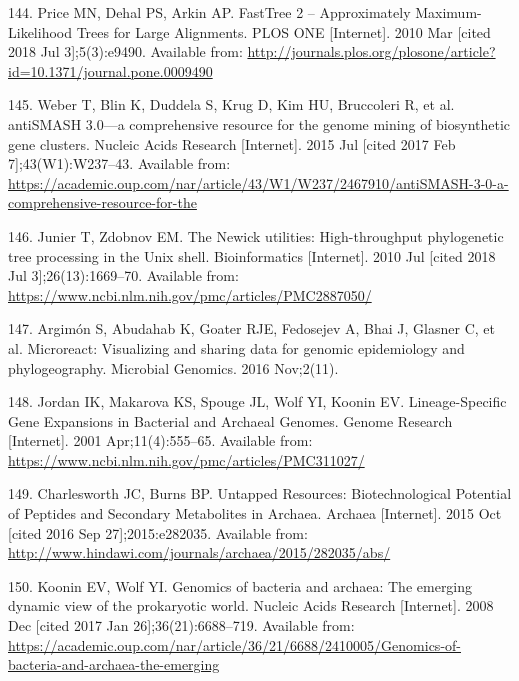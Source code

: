 \documentclass[12pt,twoside]{reedthesis}
\begin{document}
  \hypertarget{ref-price_fasttree_2010}{}
  144. Price MN, Dehal PS, Arkin AP. FastTree 2 -- Approximately
  Maximum-Likelihood Trees for Large Alignments. PLOS ONE {[}Internet{]}.
  2010 Mar {[}cited 2018 Jul 3{]};5(3):e9490. Available from:
  \url{http://journals.plos.org/plosone/article?id=10.1371/journal.pone.0009490}
  
  \hypertarget{ref-weber_antismash3_2015}{}
  145. Weber T, Blin K, Duddela S, Krug D, Kim HU, Bruccoleri R, et al.
  antiSMASH 3.0---a comprehensive resource for the genome mining of
  biosynthetic gene clusters. Nucleic Acids Research {[}Internet{]}. 2015
  Jul {[}cited 2017 Feb 7{]};43(W1):W237--43. Available from:
  \url{https://academic.oup.com/nar/article/43/W1/W237/2467910/antiSMASH-3-0-a-comprehensive-resource-for-the}
  
  \hypertarget{ref-junier_newick_2010}{}
  146. Junier T, Zdobnov EM. The Newick utilities: High-throughput
  phylogenetic tree processing in the Unix shell. Bioinformatics
  {[}Internet{]}. 2010 Jul {[}cited 2018 Jul 3{]};26(13):1669--70.
  Available from:
  \url{https://www.ncbi.nlm.nih.gov/pmc/articles/PMC2887050/}
  
  \hypertarget{ref-argimon_microreact_2016}{}
  147. Argimón S, Abudahab K, Goater RJE, Fedosejev A, Bhai J, Glasner C,
  et al. Microreact: Visualizing and sharing data for genomic epidemiology
  and phylogeography. Microbial Genomics. 2016 Nov;2(11).
  
  \hypertarget{ref-jordan_lineage-specific_2001}{}
  148. Jordan IK, Makarova KS, Spouge JL, Wolf YI, Koonin EV.
  Lineage-Specific Gene Expansions in Bacterial and Archaeal Genomes.
  Genome Research {[}Internet{]}. 2001 Apr;11(4):555--65. Available from:
  \url{https://www.ncbi.nlm.nih.gov/pmc/articles/PMC311027/}
  
  \hypertarget{ref-charlesworth_untapped_natural_products_Archaea_2015}{}
  149. Charlesworth JC, Burns BP. Untapped Resources: Biotechnological
  Potential of Peptides and Secondary Metabolites in Archaea. Archaea
  {[}Internet{]}. 2015 Oct {[}cited 2016 Sep 27{]};2015:e282035. Available
  from: \url{http://www.hindawi.com/journals/archaea/2015/282035/abs/}
  
  \hypertarget{ref-koonin_genomics_2008}{}
  150. Koonin EV, Wolf YI. Genomics of bacteria and archaea: The emerging
  dynamic view of the prokaryotic world. Nucleic Acids Research
  {[}Internet{]}. 2008 Dec {[}cited 2017 Jan 26{]};36(21):6688--719.
  Available from:
  \url{https://academic.oup.com/nar/article/36/21/6688/2410005/Genomics-of-bacteria-and-archaea-the-emerging}
  
\end{document}
